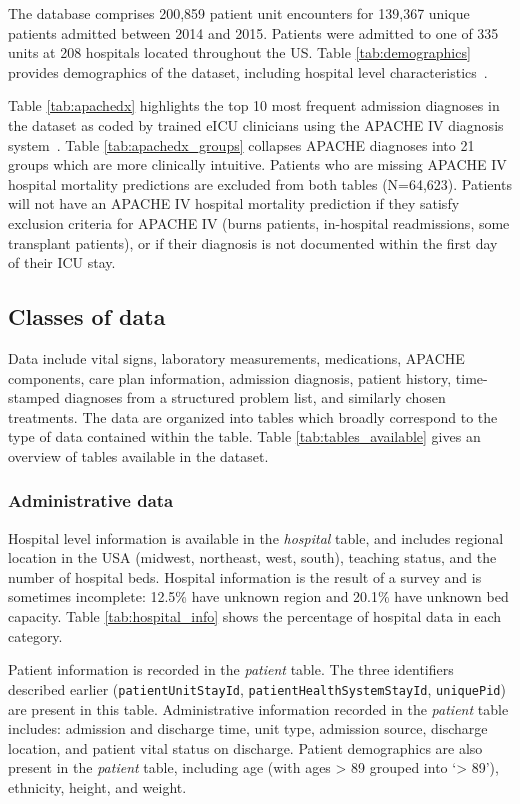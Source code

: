 \documentclass[english]{article}
\newcommand{\colname}[1]{\texttt{#1}}
\newcommand{\tblname}[1]{\emph{#1}}
\begin{document}
The database comprises 200,859 patient unit encounters for 139,367 unique
patients admitted between 2014 and 2015. Patients were admitted to one
of 335 units at 208 hospitals located throughout the US. Table \ref{tab:demographics} provides demographics of the dataset, including hospital level characteristics~\cite{tableone}.

Table \ref{tab:apachedx} highlights the top 10 most frequent admission diagnoses in the dataset as coded by trained eICU clinicians using the APACHE IV
diagnosis system~\cite{zimmerman2006acute}.
Table \ref{tab:apachedx_groups} collapses APACHE
diagnoses into 21 groups which are more clinically intuitive. Patients
who are missing APACHE IV hospital mortality predictions are excluded
from both tables (N=64,623). Patients will not have an APACHE IV
hospital mortality prediction if they satisfy exclusion criteria for
APACHE IV (burns patients, in-hospital readmissions, some transplant
patients), or if their diagnosis is not documented within the first day
of their ICU stay.

\subsection*{Classes of data}\label{classes-of-data}

Data include vital signs, laboratory measurements, medications, APACHE
components, care plan information, admission diagnosis, patient history,
time-stamped diagnoses from a structured problem list, and similarly
chosen treatments. The data are organized into tables which broadly
correspond to the type of data contained within the table. Table \ref{tab:tables_available} gives
an overview of tables available in the dataset.

\subsubsection*{Administrative data}\label{administrative-data}

Hospital level information is available in the \tblname{hospital} table, and includes regional location in the USA (midwest, northeast, west, south), teaching status, and the number of hospital beds. Hospital information is the result of a survey and is sometimes incomplete: 12.5\% have unknown region and 20.1\% have unknown bed capacity. Table \ref{tab:hospital_info} shows the percentage of hospital data in each category.

Patient information is recorded in the \tblname{patient} table. The three identifiers described earlier (\colname{patientUnitStayId}, \colname{patientHealthSystemStayId}, \colname{uniquePid}) are present in this table. Administrative information recorded in the \tblname{patient} table includes: admission and discharge time, unit type, admission source, discharge location, and patient vital status on discharge. Patient demographics are also present in the \tblname{patient} table, including age (with ages \textgreater{} 89 grouped into `\textgreater{} 89'), ethnicity, height, and weight.
\end{document}
